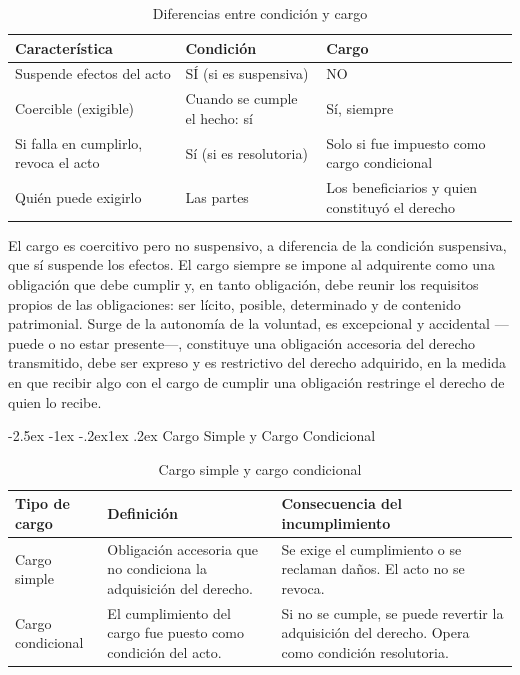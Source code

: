 \documentclass[12pt,oneside]{book}
\makeatletter
\renewcommand\subsection{\@startsection{subsection}{2}{\z@}%
  {-2.5ex \@plus -1ex \@minus -.2ex}{1ex \@plus .2ex}%
  {\normalfont\normalsize\bfseries}}
\makeatother
\begin{document}
\begin{table}[H]
\centering
\begin{tabularx}{\textwidth}{X X X}
\toprule
\textbf{Característica} & \textbf{Condición} & \textbf{Cargo} \\
\midrule
Suspende efectos del acto & SÍ (si es suspensiva) & NO \\
Coercible (exigible) & Cuando se cumple el hecho: sí & Sí, siempre \\
Si falla en cumplirlo, revoca el acto & Sí (si es resolutoria) & Solo si fue impuesto como cargo condicional \\
Quién puede exigirlo & Las partes & Los beneficiarios y quien constituyó el derecho \\
\bottomrule
\end{tabularx}
\caption{Diferencias entre condición y cargo}
\end{table}

El cargo es coercitivo pero no suspensivo, a diferencia de la condición suspensiva, que sí suspende los efectos. El cargo siempre se impone al adquirente como una obligación que debe cumplir y, en tanto obligación, debe reunir los requisitos propios de las obligaciones: ser lícito, posible, determinado y de contenido patrimonial. Surge de la autonomía de la voluntad, es excepcional y accidental ---puede o no estar presente---, constituye una obligación accesoria del derecho transmitido, debe ser expreso y es restrictivo del derecho adquirido, en la medida en que recibir algo con el cargo de cumplir una obligación restringe el derecho de quien lo recibe.

\subsection{Cargo Simple y Cargo Condicional}

\begin{table}[H]
\centering
\begin{tabularx}{\textwidth}{l X X}
\toprule
\textbf{Tipo de cargo} & \textbf{Definición} & \textbf{Consecuencia del incumplimiento} \\
\midrule
Cargo simple & Obligación accesoria que no condiciona la adquisición del derecho. & Se exige el cumplimiento o se reclaman daños. El acto no se revoca. \\
Cargo condicional & El cumplimiento del cargo fue puesto como condición del acto. & Si no se cumple, se puede revertir la adquisición del derecho. Opera como condición resolutoria. \\
\bottomrule
\end{tabularx}
\caption{Cargo simple y cargo condicional}
\end{table}
\end{document}
